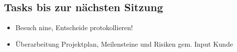 \documentclass[class=scrbook,crop=false]{standalone}
\begin{document}
    \subsection*{Tasks bis zur nächsten Sitzung}
    
    \begin{itemize}
        \item Besuch \gls{nine}, Entscheide protokollieren!
        \item Überarbeitung Projektplan, Meilensteine und Risiken gem. Input Kunde
    \end{itemize}
\end{document}
